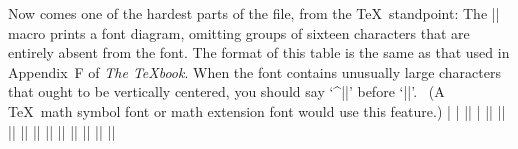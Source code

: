 Now comes one of the hardest parts of the file, from the \TeX\
standpoint: The |\table| macro prints a font diagram, omitting
groups of sixteen characters that are entirely absent from the font.
The format of this table is the same as that used in Appendix~F
of {\sl The \TeX book}. When the font contains unusually large characters
that ought to be vertically centered, you should say `^|\centerlargechars|'
before `|\table|'. \ (A \TeX\ math symbol font or math extension font
would use this feature.)
\beginlines
|\def\oct#1{\hbox{\rm\'{}\kern-.2em\it#1\/\kern.05em}} %
|\def\hex#1{\hbox{\rm\H{}\tt#1}} %
|\def\setdigs#1"#2{\gdef\h{#2}%
| \m=\n \divide\m by 64 \xdef\0{\the\m}%
| \multiply\m by-64 \advance\m by\n \divide\m by 8 \xdef\1{\the\m}}|
|\def\testrow{\setbox0=\hbox{\penalty 1\def\\{\char"\h}%
| \\0\\1\\2\\3\\4\\5\\6\\7\\8\\9\\A\\B\\C\\D\\E\\F%
| \global\p=\lastpenalty}} %
|\def\oddline{\cr|
|  \noalign{\nointerlineskip}|
|  \multispan{19}\hrulefill&|
|  \setbox0=\hbox{\lower 2.3pt\hbox{\hex{\h x}}}\smash{\box0}\cr|
|  \noalign{\nointerlineskip}}|
|\newif\ifskipping|
|\def\evenline{\loop\skippingfalse|
| \ifnum\n<256 \m=\n \divide\m 16 \chardef\next=\m|
| \expandafter\setdigs\meaning\next \testrow|
| \ifnum\p=1 \skippingtrue \fi\fi|
| \ifskipping \global\advance\n 16 \repeat|
| \ifnum\n=256 \let\next=\endchart\else\let\next=\morechart\fi|
| \next}|
|\def\morechart{\cr\noalign{\hrule\penalty5000}|
| \chartline \oddline \m=\1 \advance\m 1 \xdef\1{\the\m}|
| \chartline \evenline}|
|\def\chartline{&\oct{\0\1x}&&\:&&\:&&\:&&\:&&\:&&\:&&\:&&\:&&}|
|\def\chartstrut{\lower4.5pt\vbox to14pt{}}|
|\def\table{$$\global\n=0|
|  \halign to\hsize\bgroup|
|    \chartstrut##\tabskip0pt plus10pt&|
|    &\hfil##\hfil&\vrule##\cr|
|    \lower6.5pt\null|
|    &&&\oct0&&\oct1&&\oct2&&\oct3&&\oct4&&\oct5&&\oct6&&\oct7&\evenline}|
|\def\endchart{\cr\noalign{\hrule}|
|  \raise11.5pt\null&&&\hex 8&&\hex 9&&\hex A&&\hex B&|
|  &\hex C&&\hex D&&\hex E&&\hex F&\cr\egroup$$\par}|
|\def\:{\setbox0=\hbox{\char\n}%
|  \ifdim\ht0>7.5pt\reposition|
|  \else\ifdim\dp0>2.5pt\reposition\fi\fi|
|  \box0\global\advance\n 1 }|
|\def\reposition{\setbox0=\vbox{\kern2pt\box0}\dim=\dp0|
|  \advance\dim 2pt \dp0=\dim}|
|\def\centerlargechars{|
|  \def\reposition{\setbox0=\hbox{$\vcenter{\kern2pt\box0\kern2pt}$}}}|
\endlines

